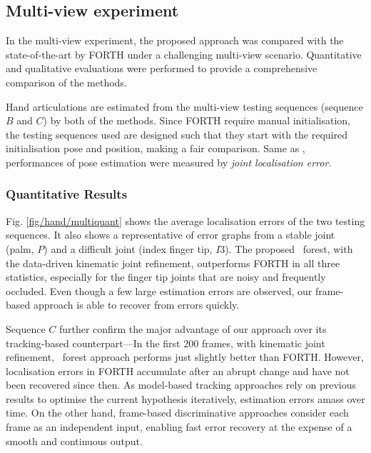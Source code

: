 
\subsection{Multi-view experiment}  

In the multi-view experiment, the proposed approach was compared with the state-of-the-art by FORTH\cite{Oikonomidis2011} under a challenging multi-view scenario. Quantitative and qualitative evaluations were performed to provide a comprehensive comparison of the methods. 

Hand articulations are estimated from the multi-view testing sequences (sequence $B$ and $C$) by both of the methods. 
Since FORTH require manual initialisation, the testing sequences used are designed such that they start with the required initialisation pose and position, making a fair comparison.   
Same as \cite{Oikonomidis2011},  
performances of pose estimation were measured by \emph{joint localisation error}.

\subsubsection{Quantitative Results}
Fig. \ref{fig/hand/multiquant} shows the average localisation errors of the two testing sequences. It also shows a representative of error graphs from a stable joint (palm, $P$) and a difficult joint (index finger tip, $I3$). The proposed \STR\ forest, with the data-driven kinematic joint refinement, outperforms FORTH in all three statistics, especially for the finger tip joints that are noisy and frequently occluded. Even though a few large estimation errors are observed, our frame-based approach is able to recover from errors quickly.    

Sequence $C$ further confirm the major advantage of our approach over its tracking-based counterpart---In the first $200$ frames, with kinematic joint refinement, \STR\ forest approach performs just slightly better than FORTH. However, localisation errors in FORTH accumulate after an abrupt change and have not been recovered since then. As model-based tracking approaches rely on previous results to optimise the current hypothesis iteratively, estimation errors amass over time. On the other hand, frame-based discriminative approaches consider each frame as an independent input, enabling fast error recovery at the expense of a smooth and continuous output. 

